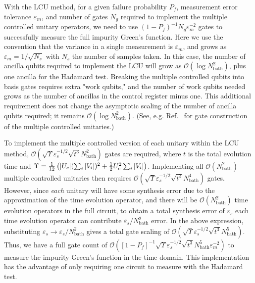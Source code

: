 \documentclass[aip,reprint,table,xcdraw,usenames,dvipsnames]{revtex4-1}
\begin{document}
With the LCU method, for a given failure probability $P_f$, measurement error tolerance $\varepsilon_m$, and number of gates $N_g$ required to implement the multiple controlled unitary operators, we need to use $(1-P_f)^{-1} 
N_g \varepsilon_m^{-2}$ gates to successfully measure the full impurity 
Green's function. Here we use the convention that the variance in a 
single measurement is $\varepsilon_m$, and grows as $\varepsilon_m = 1/\sqrt{N_s}$ with $N_s$ the number of samples taken. In this case, the number
of ancilla qubits required to implement the LCU will grow as $\mathcal{O}
(\log N_{\text{bath}}^2 )$, plus one ancilla for the Hadamard test. Breaking the multiple controlled
qubits into basis gates requires extra "work qubits," and the number of work qubits needed grows as the number of ancillas in the control register minus one. This additional requirement does not change the asymptotic scaling of the number of ancilla qubits required; it remains
$\mathcal{O}(\log N_{\text{bath}}^2 )$.
(See, e.g. Ref.~ for gate construction of the multiple controlled unitaries.) 



To implement the multiple controlled version of each unitary within the LCU method, $\mathcal{O}(\sqrt{\Upsilon}\varepsilon_s^{-1/2} \sqrt{t^3} N_{\text{bath}}^2)$ gates are 
required, where $t$ is the total 
evolution time and $\Upsilon = \frac{1}{12} \left( \abs{ U_c} (\sum_i \abs{V_i})^2 + \frac{1}{2} U_c^2 \sum_i \abs{V_i} \right)$. Implementing all $\mathcal{O} (N_{\text{bath}}^2)$ multiple 
controlled unitaries then requires $\mathcal{O}(\sqrt{\Upsilon}\varepsilon_s^{-1/2} 
\sqrt{t^3} N_{\text{bath}}^4)$ gates. However, since 
\emph{each} unitary will have some synthesis error due to the approximation of 
the time evolution operator, and there will be $\mathcal{O}(N_{\text{bath}}^2)$
time evolution operators in the full circuit, to obtain a total synthesis 
error of $\varepsilon_s$ each time evolution operator can contribute 
$\varepsilon_s/N_{\text{bath}}^2$ error. In the above expression, substituting 
$\varepsilon_s \to \varepsilon_s/N_{\text{bath}}^2$ gives a total gate scaling of 
$\mathcal{O}(\sqrt{\Upsilon}\varepsilon_s^{-1/2} \sqrt{t^3} N_{\text{bath}}^5)$. Thus, we have a full gate count of $\mathcal{O}([1-P_f]^{-1} \sqrt{\Upsilon} \varepsilon_s^{-1/2} 
\sqrt{t^3} N_{\text{bath}}^5 \varepsilon_m^{-2})$ to measure the impurity 
Green's function in the time domain. This implementation has
the advantage of only requiring one circuit to measure
with the Hadamard test.
\end{document}
